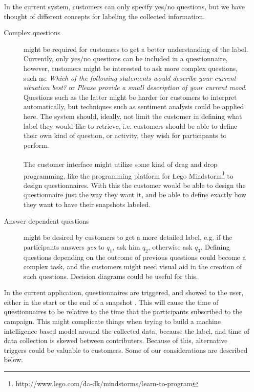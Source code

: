 In the current system, customers can only specify yes/no questions, but we have thought of different concepts for labeling the collected information.

\begin{description}
    \item[Complex questions] might be required for customers to get a better understanding of the label. Currently, only yes/no questions can be included in a questionnaire, however, customers might be interested to ask more complex questions, such as: \emph{Which of the following statements would describe your current situation best?} or \emph{Please provide a small description of your current mood}. Questions such as the latter might be harder for customers to interpret automatically, but techniques such as sentiment analysis \parencite{pang2008opinion} could be applied here. The system should, ideally, not limit the customer in defining what label they would like to retrieve, i.e. customers should be able to define their own kind of question, or activity, they wish for participants to perform. 
    \\\\
    The customer interface might utilize some kind of drag and drop programming, like the programming platform for Lego Mindstorm\footnote{http://www.lego.com/da-dk/mindstorms/learn-to-program} to design questionnaires. With this the customer would be able to design the questionnaire just the way they want it, and be able to define exactly how they want to have their snapshots labeled. 

    \item[Answer dependent questions] might be desired by customers to get a more detailed label, e.g. if the participants answers \emph{yes} to $q_1$, ask him $q_2$, otherwise ask $q_3$. Defining questions depending on the outcome of previous questions could become a complex task, and the customers might need visual aid in the creation of such questions. Decision diagrams could be useful for this.
\end{description}

In the current application, questionnaires are triggered, and showed to the user, either in the start or the end of a snapshot . This will cause the time of questionnaires to be relative to the time that the participants subscribed to the campaign. This might complicate things when trying to build a machine intelligence based model around the collected data, because the label, and time of data collection is skewed between contributers. Because of this, alternative triggers could be valuable to customers. Some of our considerations are described below.

